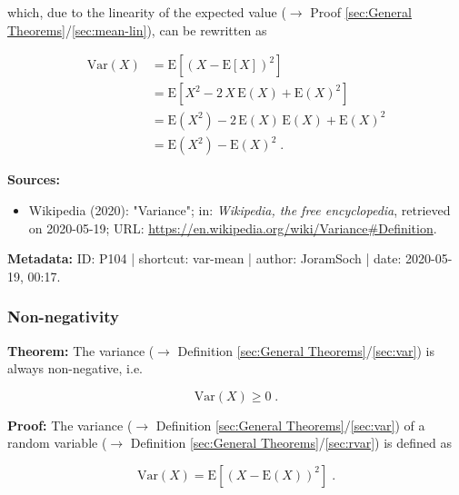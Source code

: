 \documentclass[a4paper,12pt,twoside]{book}
\begin{document}
which, due to the linearity of the expected value ($\rightarrow$ Proof \ref{sec:General Theorems}/\ref{sec:mean-lin}), can be rewritten as

\begin{equation} \label{eq:var-mean-var-mean-qed}
\begin{split}
\mathrm{Var}(X) &= \mathrm{E}\left[ \left( X - \mathrm{E}[X] \right)^2 \right] \\
&= \mathrm{E}\left[ X^2 - 2 \, X \, \mathrm{E}(X) + \mathrm{E}(X)^2 \right] \\
&= \mathrm{E}(X^2) - 2 \, \mathrm{E}(X) \, \mathrm{E}(X) + \mathrm{E}(X)^2 \\
&= \mathrm{E}(X^2) - \mathrm{E}(X)^2 \; .
\end{split}
\end{equation}


\vspace{1em}
\textbf{Sources:}
\begin{itemize}
\item Wikipedia (2020): "Variance"; in: \textit{Wikipedia, the free encyclopedia}, retrieved on 2020-05-19; URL: \url{https://en.wikipedia.org/wiki/Variance#Definition}.
\end{itemize}


\vspace{1em}
\textbf{Metadata:} ID: P104 | shortcut: var-mean | author: JoramSoch | date: 2020-05-19, 00:17.
\vspace{1em}



\subsubsection[\textbf{Non-negativity}]{Non-negativity} \label{sec:var-nonneg}
\setcounter{equation}{0}

\textbf{Theorem:} The variance ($\rightarrow$ Definition \ref{sec:General Theorems}/\ref{sec:var}) is always non-negative, i.e.

\begin{equation} \label{eq:var-nonneg-var-nonneg}
\mathrm{Var}(X) \geq 0 \; .
\end{equation}


\vspace{1em}
\textbf{Proof:} The variance ($\rightarrow$ Definition \ref{sec:General Theorems}/\ref{sec:var}) of a random variable ($\rightarrow$ Definition \ref{sec:General Theorems}/\ref{sec:rvar}) is defined as

\begin{equation} \label{eq:var-nonneg-var}
\mathrm{Var}(X) = \mathrm{E}\left[ (X-\mathrm{E}(X))^2 \right] \; .
\end{equation}
\end{document}
